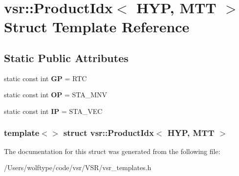 \hypertarget{structvsr_1_1_product_idx_3_01_h_y_p_00_01_m_t_t_01_4}{\section{vsr\-:\-:Product\-Idx$<$ H\-Y\-P, M\-T\-T $>$ Struct Template Reference}
\label{structvsr_1_1_product_idx_3_01_h_y_p_00_01_m_t_t_01_4}
}
\subsection*{Static Public Attributes}
\begin{DoxyCompactItemize}
\item 
\hypertarget{structvsr_1_1_product_idx_3_01_h_y_p_00_01_m_t_t_01_4_a897464a7fa152c5fe5972d95cfc15cdb}{static const int {\bfseries G\-P} = R\-T\-C}\label{structvsr_1_1_product_idx_3_01_h_y_p_00_01_m_t_t_01_4_a897464a7fa152c5fe5972d95cfc15cdb}

\item 
\hypertarget{structvsr_1_1_product_idx_3_01_h_y_p_00_01_m_t_t_01_4_acc70646a1eaf6c2123b68a2513b9bf21}{static const int {\bfseries O\-P} = S\-T\-A\-\_\-\-M\-N\-V}\label{structvsr_1_1_product_idx_3_01_h_y_p_00_01_m_t_t_01_4_acc70646a1eaf6c2123b68a2513b9bf21}

\item 
\hypertarget{structvsr_1_1_product_idx_3_01_h_y_p_00_01_m_t_t_01_4_a66770e4eae276d5f65b3378eebcd4e3a}{static const int {\bfseries I\-P} = S\-T\-A\-\_\-\-V\-E\-C}\label{structvsr_1_1_product_idx_3_01_h_y_p_00_01_m_t_t_01_4_a66770e4eae276d5f65b3378eebcd4e3a}

\end{DoxyCompactItemize}
\subsubsection*{template$<$$>$ struct vsr\-::\-Product\-Idx$<$ H\-Y\-P, M\-T\-T $>$}



The documentation for this struct was generated from the following file\-:\begin{DoxyCompactItemize}
\item 
/\-Users/wolftype/code/vsr/\-V\-S\-R/vsr\-\_\-templates.\-h\end{DoxyCompactItemize}
